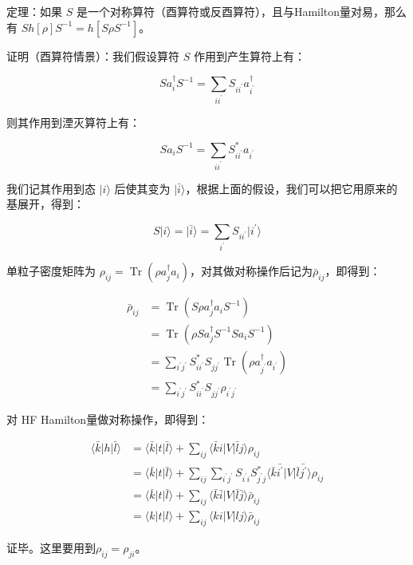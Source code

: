 \begin{booknote*}
定理：如果 $S$ 是一个对称算符（酉算符或反酉算符），且与Hamilton量对易，那么有 $Sh[\rho]S^{-1}=h[S\rho S^{-1}]$。

证明（酉算符情景）：我们假设算符 $S$ 作用到产生算符上有：

\[
Sa^{\dagger}_{i}S^{-1}=\sum_{ii^{\prime}}S_{ii^{\prime}}a^{\dagger}_{i^{\prime}}
\]

则其作用到湮灭算符上有：

\[
Sa_{i}S^{-1}=\sum_{ii^{\prime}}S^{*}_{ii^{\prime}}a_{i^{\prime}}
\]

我们记其作用到态 $|i\rangle$ 后使其变为 $|\bar{i}\rangle$，根据上面的假设，我们可以把它用原来的基展开，得到：

\[
S|i\rangle=|\bar{i}\rangle=\sum_{i^{\prime}}S_{ii^{\prime}}|i^{\prime}\rangle
\]

单粒子密度矩阵为 $\rho_{ij}=\mathop{\text{Tr}}(\rho a^{\dagger}_{j}a_{i})$，对其做对称操作后记为$\bar{\rho}_{ij}$，即得到：

\[
\begin{aligned}\bar{\rho}_{ij} & =\mathop{\text{Tr}}(S\rho a^{\dagger}_{j}a_{i}S^{-1})\\
 & =\mathop{\text{Tr}}(\rho Sa^{\dagger}_{j}S^{-1}Sa_{i}S^{-1})\\
 & =\sum_{i^{\prime}j^{\prime}}S^{*}_{ii^{\prime}}S_{jj^{\prime}}\mathop{\text{Tr}}(\rho a^{\dagger}_{j^{\prime}}a_{i^{\prime}})\\
 & =\sum_{i^{\prime}j^{\prime}}S^{*}_{ii^{\prime}}S_{jj^{\prime}}\rho_{i^{\prime}j^{\prime}}
\end{aligned}
\]

对 HF Hamilton量做对称操作，即得到：

\[
\begin{aligned}\langle\bar{k}|h|\bar{l}\rangle & =\langle\bar{k}|t|\bar{l}\rangle+\sum_{ij}\langle\bar{k}i|V|\bar{l}j\rangle\rho_{ij}\\
 & =\langle\bar{k}|t|\bar{l}\rangle+\sum_{ij}\sum_{i^{\prime}j^{\prime}}S_{i^{\prime}i}S^{*}_{j^{\prime}j}\langle\bar{k}\bar{i^{\prime}}|V|\bar{l}\bar{j^{\prime}}\rangle\rho_{ij}\\
 & =\langle\bar{k}|t|\bar{l}\rangle+\sum_{ij}\langle\bar{k}\bar{i}|V|\bar{l}\bar{j}\rangle\bar{\rho}_{ij}\\
 & =\langle k|t|l\rangle+\sum_{ij}\langle ki|V|lj\rangle\bar{\rho}_{ij}
\end{aligned}
\]

证毕。这里要用到$\rho_{ij}=\rho_{ji}$。


\end{booknote*}
